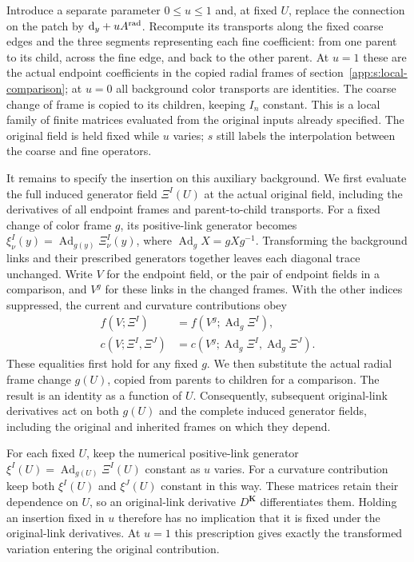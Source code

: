 \documentclass[11pt,a4paper]{article}
\theoremstyle{remark}
\DeclareMathOperator{\Ad}{Ad}
\newcommand{\dd}{\mathrm d}
\begin{document}
Introduce a separate parameter $0\le u\le1$ and, at fixed $U$,
replace the connection on the patch by $\dd_y+uA^{\rm rad}$.
Recompute its transports along the fixed coarse edges and the three
segments representing each fine coefficient: from one parent to its
child, across the fine edge, and back to the other parent. At $u=1$
these are the actual endpoint coefficients in the copied radial frames
of section~\ref{app:s:local-comparison}; at $u=0$ all background
color transports are identities. The coarse change of frame is copied
to its children, keeping $I_n$ constant. This is a local family of
finite matrices evaluated from the original inputs already specified.
The original field is held fixed while $u$ varies; $s$ still labels
the interpolation between the coarse and fine operators.

It remains to specify the insertion on this auxiliary background.
We first evaluate the full induced generator field $\Xi^I(U)$ at the actual
original field, including the derivatives of all endpoint frames and
parent-to-child transports. For a fixed change of color frame $g$, its
positive-link generator becomes
$\xi^I_\nu(y)=\Ad_{g(y)}\Xi^I_\nu(y)$, where
$\Ad_gX=gXg^{-1}$. Transforming the background links and their
prescribed generators together leaves each diagonal trace unchanged.
Write $V$ for the endpoint field, or the pair of endpoint fields in a
comparison, and $V^g$ for these links in the changed frames. With the
other indices suppressed, the current and curvature contributions obey
\begin{equation}
 \begin{split}
 f(V;\Xi^I)&=f(V^g;\Ad_g\Xi^I),\\
 c(V;\Xi^I,\Xi^J)
     &=c(V^g;\Ad_g\Xi^I,\Ad_g\Xi^J).
 \end{split}
\end{equation}
These equalities first hold for any fixed $g$. We then substitute the
actual radial frame change $g(U)$, copied from parents to children for
a comparison. The result is an identity as a function of $U$.
Consequently, subsequent original-link derivatives act on both $g(U)$
and the complete induced generator fields, including the original and inherited
frames on which they depend.

For each fixed $U$, keep the numerical positive-link generator
$\xi^I(U)=\Ad_{g(U)}\Xi^I(U)$ constant as $u$ varies. For a
curvature contribution keep both $\xi^I(U)$ and $\xi^J(U)$
constant in this way. These matrices retain their dependence on $U$,
so an original-link derivative $D^{\boldsymbol K}$ differentiates
them. Holding an insertion fixed in $u$ therefore has no implication
that it is fixed under the original-link derivatives. At $u=1$ this
prescription gives exactly the transformed variation entering the
original contribution.
\end{document}
